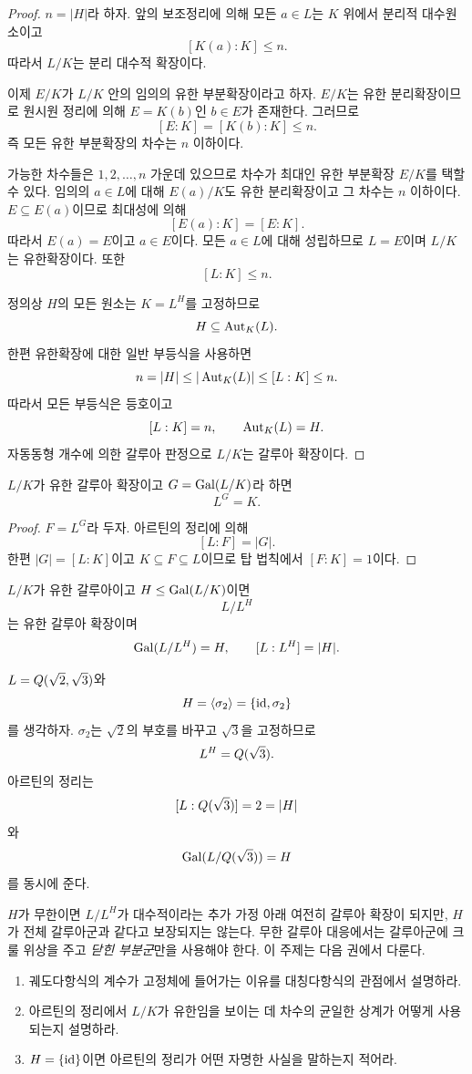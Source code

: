 \begin{proof}
$n=|H|$라 하자. 앞의 보조정리에 의해 모든 $a\in L$는 $K$ 위에서 분리적 대수원소이고
\[
  [K(a):K]\le n.
\]
따라서 $L/K$는 분리 대수적 확장이다.

이제 $E/K$가 $L/K$ 안의 임의의 유한 부분확장이라고 하자. $E/K$는 유한 분리확장이므로 원시원 정리에 의해 $E=K(b)$인 $b\in E$가 존재한다. 그러므로
\[
  [E:K]=[K(b):K]\le n.
\]
즉 모든 유한 부분확장의 차수는 $n$ 이하이다.

가능한 차수들은 $1,2,\dots,n$ 가운데 있으므로 차수가 최대인 유한 부분확장 $E/K$를 택할 수 있다. 임의의 $a\in L$에 대해 $E(a)/K$도 유한 분리확장이고 그 차수는 $n$ 이하이다. $E\subseteq E(a)$이므로 최대성에 의해
\[
  [E(a):K]=[E:K].
\]
따라서 $E(a)=E$이고 $a\in E$이다. 모든 $a\in L$에 대해 성립하므로 $L=E$이며 $L/K$는 유한확장이다. 또한
\[
  [L:K]\le n.
\]

정의상 $H$의 모든 원소는 $K=L^H$를 고정하므로
\[
  H\subseteq\operatorname{Aut}_K(L).
\]
한편 유한확장에 대한 일반 부등식을 사용하면
\[
  n=|H|
  \le|\operatorname{Aut}_K(L)|
  \le[L:K]
  \le n.
\]
따라서 모든 부등식은 등호이고
\[
  [L:K]=n,
  \qquad
  \operatorname{Aut}_K(L)=H.
\]
자동동형 개수에 의한 갈루아 판정으로 $L/K$는 갈루아 확장이다.
\end{proof}

\begin{corollary}
$L/K$가 유한 갈루아 확장이고 $G=\operatorname{Gal}(L/K)$라 하면
\[
  L^G=K.
\]
\end{corollary}

\begin{proof}
$F=L^G$라 두자. 아르틴의 정리에 의해
\[
  [L:F]=|G|.
\]
한편 $|G|=[L:K]$이고 $K\subseteq F\subseteq L$이므로 탑 법칙에서 $[F:K]=1$이다.
\end{proof}

\begin{corollary}
$L/K$가 유한 갈루아이고 $H\le\operatorname{Gal}(L/K)$이면
\[
  L/L^H
\]
는 유한 갈루아 확장이며
\[
  \operatorname{Gal}(L/L^H)=H,
  \qquad
  [L:L^H]=|H|.
\]
\end{corollary}

\begin{example}
$L=Q(\sqrt2,\sqrt3)$와
\[
  H=\langle\sigma_2\rangle
  =\{\operatorname{id},\sigma_2\}
\]
를 생각하자. $\sigma_2$는 $\sqrt2$의 부호를 바꾸고 $\sqrt3$을 고정하므로
\[
  L^H=Q(\sqrt3).
\]
아르틴의 정리는
\[
  [L:Q(\sqrt3)]=2=|H|
\]
와
\[
  \operatorname{Gal}(L/Q(\sqrt3))=H
\]
를 동시에 준다.
\end{example}

\begin{remark}
$H$가 무한이면 $L/L^H$가 대수적이라는 추가 가정 아래 여전히 갈루아 확장이 되지만, $H$가 전체 갈루아군과 같다고 보장되지는 않는다. 무한 갈루아 대응에서는 갈루아군에 크룰 위상을 주고 \emph{닫힌 부분군}만을 사용해야 한다. 이 주제는 다음 권에서 다룬다.
\end{remark}

\begin{checkpoint}
\begin{enumerate}[label=(\alph*)]
  \item 궤도다항식의 계수가 고정체에 들어가는 이유를 대칭다항식의 관점에서 설명하라.
  \item 아르틴의 정리에서 $L/K$가 유한임을 보이는 데 차수의 균일한 상계가 어떻게 사용되는지 설명하라.
  \item $H=\{\operatorname{id}\}$이면 아르틴의 정리가 어떤 자명한 사실을 말하는지 적어라.
\end{enumerate}
\end{checkpoint}
